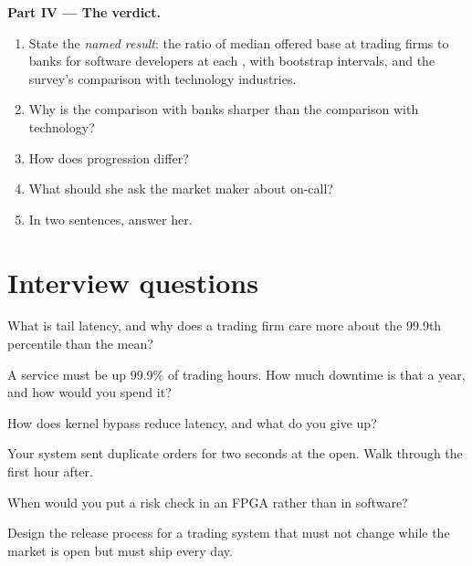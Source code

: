 \begin{problem}
\medskip\noindent\textbf{Part IV --- The verdict.}
\begin{enumerate}[resume]
\item State the \emph{named result}: the ratio of median offered base at trading firms to banks for software developers
at each , with bootstrap intervals, and the survey's comparison with technology industries.
\item Why is the comparison with banks sharper than the comparison with technology?
\item How does progression differ?
\item What should she ask the market maker about on-call?
\item In two sentences, answer her.
\end{enumerate}
\end{problem}

\section{Interview questions}

\begin{interviewq}\label{iq:in:software-engineer:1}
What is tail latency, and why does a trading firm care more about the 99.9th percentile than the mean?
\end{interviewq}

\begin{interviewq}\label{iq:in:software-engineer:2}
A service must be up 99.9\% of trading hours. How much downtime is that a year, and how would you spend it?
\end{interviewq}

\begin{interviewq}\label{iq:in:software-engineer:3}
How does kernel bypass reduce latency, and what do you give up?
\end{interviewq}

\begin{interviewq}\label{iq:in:software-engineer:4}
Your system sent duplicate orders for two seconds at the open. Walk through the first hour after.
\end{interviewq}

\begin{interviewq}\label{iq:in:software-engineer:5}
When would you put a risk check in an FPGA rather than in software?
\end{interviewq}

\begin{interviewq}\label{iq:in:software-engineer:6}
Design the release process for a trading system that must not change while the market is open but must ship every day.
\end{interviewq}
